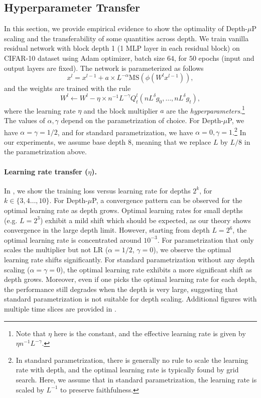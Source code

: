 \documentclass{article}
\theoremstyle{plain}
\theoremstyle{definition}
\begin{document}
\subsection{Hyperparameter Transfer}
In this section, we provide empirical evidence to show the optimality of Depth-$\mu$P scaling and the transferability of some quantities across depth. We train vanilla residual network with block depth 1 (1 MLP layer in each residual block) on CIFAR-10 dataset using Adam optimizer, batch size $64$, for $50$ epochs (input and output layers are fixed). The network is parameterized as 
follows
$$
x^l = x^{l-1}+ a \times L^{-\alpha} \textrm{MS}(\phi(W^l x^{l-1})),
$$
and the weights are trained with the rule
$$
  W^{l}\gets W^{l}-\eta \times n^{-1} L^{-\gamma}Q^l_t(n L^{\delta} g_{0},\ldots,n L^{\delta} g_{t}),
$$
where the learning rate $\eta$ and the block multiplier $a$ are the \emph{hyperparameters}.\footnote{Note that $\eta$ here is the constant, and the effective learning rate is given by $\eta n^{-1} L^{-\gamma}$.} The values of $\alpha, \gamma$ depend on the parametrization of choice. For Depth-$\mu$P, we have $\alpha=\gamma=1/2$, and for standard parametrization, we have $\alpha=0,\gamma=1$.\footnote{In standard parametrization, there is generally no rule to scale the learning rate with depth, and the optimal learning rate is typically found by grid search. Here, we assume that in standard parametrization, the learning rate is scaled by $L^{-1}$ to preserve faithfulness.} In our experiments, we assume base depth $8$, meaning that we replace $L$ by $L/8$ in the parametrization above.

\paragraph{Learning rate transfer ($\eta$). }In , we show the training loss versus learning rate for depths $2^k$, for $k\in \{3,4\dots,10\}$. For Depth-$\mu$P, a convergence pattern can be observed for the optimal learning rate as depth grows. Optimal learning rates for small depths (e.g. $L=2^3$) exhibit a mild shift which should be expected, as our theory shows convergence in the large depth limit.  However, starting from depth $L=2^6$, the optimal learning rate is concentrated around $10^{-3}$. 
For parametrization that only scales the multiplier but not LR ($\alpha=1/2$, $\gamma=0$), we observe the optimal learning rate shifts significantly. 
For standard parametrization without any depth scaling  ($\alpha=\gamma=0$), the optimal learning rate exhibits a more significant shift as depth grows. Moreover, even if one picks the optimal learning rate for each depth, the performance still degrades when the depth is very large, suggesting that standard parametrization is not suitable for depth scaling. Additional figures with multiple time slices are provided in .
\end{document}
